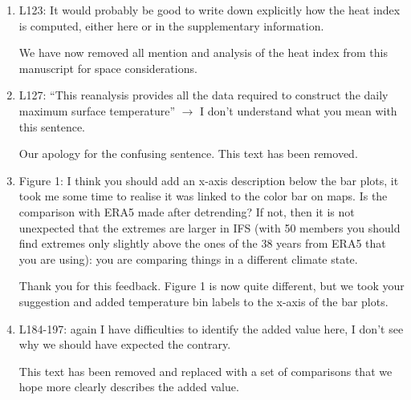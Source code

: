 \documentclass[11pt]{article}
\newcommand{\newTxt}{\textcolor{cadmiumgreen}}
\begin{document}
\begin{enumerate}
    \newTxt{Fair point. We have removed the referenced text.}

    \item L123: It would probably be good to write down explicitly how the heat index is computed, either here or in the supplementary information.

    \newTxt{We have now removed all mention and analysis of the heat index from this manuscript for space considerations.}
    
    \item L127: “This reanalysis provides all the data required to construct the daily maximum surface temperature” $\rightarrow$ I don’t understand what you mean with this sentence.

    \newTxt{Our apology for the confusing sentence. This text has been removed.}

    \item Figure 1: I think you should add an x-axis description below the bar plots, it took me some time to realise it was linked to the color bar on maps. Is the comparison with ERA5 made after detrending? If not, then it is not unexpected that the extremes are larger in IFS (with 50 members you should find extremes only slightly above the ones of the 38 years from ERA5 that you are using): you are comparing things in a different climate state.

    \newTxt{Thank you for this feedback. Figure 1 is now quite different, but we took your suggestion and added temperature bin labels to the x-axis of the bar plots.}

    \item L184-197: again I have difficulties to identify the added value here, I don’t see why we should have expected the contrary.

    \newTxt{This text has been removed and replaced with a set of comparisons that we hope more clearly describes the added value.}


\end{enumerate}
\end{document}
